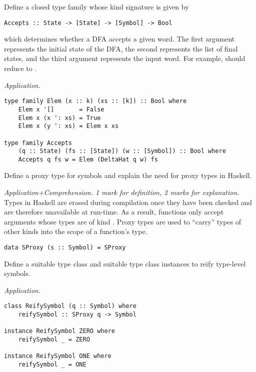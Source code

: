 \begin{parts}
\begin{subparts}
        \ifprintanswers \else \pagebreak \fi
    
        \subpart[8] Define a closed type family whose kind signature is given by 
        \vspace*{0.2cm}
\begin{verbatim}
Accepts :: State -> [State] -> [Symbol] -> Bool
\end{verbatim}
\vspace*{0.2cm}
        which determines whether a DFA accepts a given word. The first argument represents the initial state of the DFA, the second represents the list of final states, and the third argument represents the input word. For example,  should reduce to .
        \droppoints 
        
        \begin{solution}
            \emph{Application.}
\begin{verbatim}
type family Elem (x :: k) (xs :: [k]) :: Bool where 
    Elem x '[]       = False 
    Elem x (x ': xs) = True 
    Elem x (y ': xs) = Elem x xs

type family Accepts 
    (q :: State) (fs :: [State]) (w :: [Symbol]) :: Bool where 
    Accepts q fs w = Elem (DeltaHat q w) fs
\end{verbatim}
        \end{solution}
        
        \subpart[3] Define a proxy type for symbols and explain the need for proxy types in Haskell. \droppoints 
        
        \begin{solution}
            \emph{Application+Comprehension. 1 mark for definition, 2 marks for explanation.} Types in Haskell are erased during compilation once they have been checked and are therefore unavailable at run-time. As a result, functions only accept arguments whose types are of kind \haskellIn{*}. Proxy types are used to ``carry'' types of other kinds into the scope of a function's type.
            
\begin{verbatim}
data SProxy (s :: Symbol) = SProxy
\end{verbatim}
        \end{solution}
        
        \subpart[4] Define a suitable type class and suitable type class instances to reify type-level symbols. \droppoints 
        
        \begin{solution}
            \emph{Application.} 
\begin{verbatim}
class ReifySymbol (q :: Symbol) where 
    reifySymbol :: SProxy q -> Symbol

instance ReifySymbol ZERO where 
    reifySymbol _ = ZERO 

instance ReifySymbol ONE where 
    reifySymbol _ = ONE
\end{verbatim}
        \end{solution}
        
    \end{subparts}
\end{parts}
